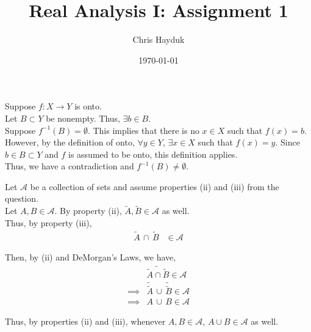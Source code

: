 \documentclass[12pt]{article}
\newenvironment{problem}[2][Problem]{\begin{trivlist}
\item[\hskip \labelsep {\bfseries #1}\hskip \labelsep {\bfseries #2.}]}{\end{trivlist}}
\begin{document}
\title{Real Analysis I: Assignment 1}

\author{Chris Hayduk}
\date{\today}

\maketitle

\begin{problem}{1}
\end{problem}

Suppose $f: X \to Y$ is onto.\\

Let $B \subset Y$ be nonempty. Thus, $\exists b \in B$.\\

Suppose $f^{-1}(B) = \emptyset$. This implies that there is no $x \in X$ such that $f(x) = b$.\\

However, by the definition of onto, $\forall y \in Y$, $\exists x \in X$ such that $f(x) = y$. Since $b \in B \subset Y$ and $f$ is assumed to be onto, this definition applies.\\

Thus, we have a contradiction and $f^{-1}(B) \neq \emptyset$.

\begin{problem}{2}
\end{problem}

Let $\mathscr{A}$ be a collection of sets and assume properties (ii) and (iii) from the question.\\

Let $A, B \in \mathscr{A}$. By property (ii), $\tilde{A}, \tilde{B} \in \mathscr{A}$ as well.\\

Thus, by property (iii),
\begin{align*}
\tilde{A} \, \cap \, \tilde{B} &\in \mathscr{A}
\end{align*}

Then, by (ii) and DeMorgan's Laws, we have,
\begin{align*}
&\widetilde{\tilde{A} \cap \tilde{B}} \in \mathscr{A}\\
\implies &\tilde{\tilde{A}} \, \cup \, \tilde{\tilde{B}} \in \mathscr{A}\\
\implies &A \, \cup \, B \in \mathscr{A}
\end{align*}

Thus, by properties (ii) and (iii), whenever $A, B \in \mathscr{A}$, $A \cup B \in \mathscr{A}$ as well.

\newpage
\begin{problem}{3}
\end{problem}
\end{document}
